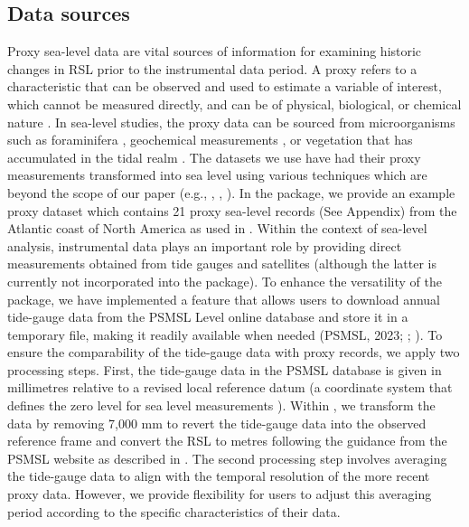 \subsection{Data sources}\label{data}
Proxy sea-level data are vital sources of information for examining historic changes in RSL prior to the instrumental data period. A proxy refers to a characteristic that can be observed and used to estimate a variable of interest, which cannot be measured directly, and can be of physical, biological, or chemical nature \citep[e.g.,][]{Gornitz2009}. In sea-level studies, the proxy data can be sourced from microorganisms such as foraminifera \citep[e.g.,][]{Edwards2015_SLhandbook}, geochemical measurements \citep[e.g.,][]{Marshall2015_SLhandbook}, or vegetation that has accumulated in the tidal realm \citep[e.g.,][]{Kemp2015_SLhandbook}. The datasets we use have had their proxy measurements transformed into sea level using various techniques which are beyond the scope of our paper (e.g., \citet{Gehrels1994}, \citet{Shennan2015_Handbook}, \citet{Kemp2018}). In the  package, we provide an example proxy dataset which contains 21 proxy sea-level records (See Appendix) from the Atlantic coast of North America as used in \citet{Upton2023noisy}.
Within the context of sea-level analysis, instrumental data plays an important role by providing direct measurements obtained from tide gauges and satellites (although the latter is currently not incorporated into the  package). To enhance the versatility of the package, we have implemented a feature that allows users to download annual tide-gauge data from the PSMSL Level online database and store it in a temporary file, making it readily available when needed (PSMSL, 2023; \citet{Holgate_PSMSL2013}; \citet{Woodworth2003}).
To ensure the comparability of the tide-gauge data with proxy records, we apply two processing steps. First, the tide-gauge data in the PSMSL database is given in millimetres relative to a revised local reference datum (a coordinate system that defines the zero level for sea level measurements \citet{pugh_woodworth_2014b}). Within , we transform the data by removing 7,000 mm to revert the tide-gauge data into the observed reference frame and convert the RSL to metres following the guidance from the PSMSL website as described in \citet{PSMSLinstruction}. The second processing step involves averaging the tide-gauge data to align with the temporal resolution of the more recent proxy data. However, we provide flexibility for users to adjust this averaging period according to the specific characteristics of their data.
